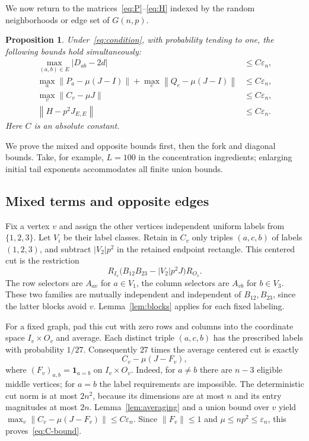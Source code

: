 \documentclass[11pt]{article}
\newtheorem{proposition}[theorem]{Proposition}
\theoremstyle{remark}
\newcommand{\one}{\mathbf 1}
\newcommand{\norm}[1]{\left\lVert#1\right\rVert}
\begin{document}
We now return to the matrices~\eqref{eq:P}--\eqref{eq:H} indexed by the
random neighborhoods or edge set of $G(n,p)$.

\begin{proposition}\label{prop:matrices}
Under~\eqref{eq:condition}, with probability tending to one, the following
bounds hold simultaneously:
\begin{align}
 \max_{(a,b)\in E}|D_{ab}-2d|&\leq C\varepsilon_n,\label{eq:D-bound}\\
 \max_a\norm{P_a-\mu(J-I)}+
 \max_e\norm{Q_e-\mu(J-I)}&\leq C\varepsilon_n,\label{eq:fork-bound}\\
 \max_v\norm{C_v-\mu J}&\leq C\varepsilon_n,\label{eq:C-bound}\\
 \norm{H-p^2J_{E,E}}&\leq C\varepsilon_n.\label{eq:H-bound}
\end{align}
Here $C$ is an absolute constant.
\end{proposition}

We prove the mixed and opposite bounds first, then the fork and diagonal
bounds. Take, for example, $L=100$ in the concentration ingredients;
enlarging initial tail exponents accommodates all finite union bounds.

\subsection{Mixed terms and opposite edges}

Fix a vertex $v$ and assign the other vertices independent uniform labels
from $\{1,2,3\}$. Let $V_i$ be their label classes. Retain in $C_v$
only triples $(a,c,b)$ of labels $(1,2,3)$, and subtract
$|V_2|p^2$ in the retained endpoint rectangle. This centered cut is the
restriction
\[
 R_{I_v}\bigl(B_{12}B_{23}-|V_2|p^2J\bigr)R_{O_v}.
\]
The row selectors are $A_{av}$ for $a\in V_1$, the column selectors
are $A_{vb}$ for $b\in V_3$. These two families are mutually independent
and independent of $B_{12},B_{23}$, since the latter blocks avoid $v$.
Lemma~\ref{lem:blocks} applies for each fixed labeling.

For a fixed graph, pad this cut with zero rows and columns into the
coordinate space $I_v\times O_v$ and average. Each distinct triple
$(a,c,b)$ has the prescribed labels with probability $1/27$.
Consequently $27$ times the average centered cut is exactly
\[
 C_v-\mu(J-F_v),
\]
where $(F_v)_{a,b}=\one_{a=b}$ on $I_v\times O_v$.
Indeed, for $a\ne b$ there are $n-3$ eligible middle vertices; for
$a=b$ the label requirements are impossible. The deterministic cut norm
is at most $2n^2$, because its dimensions are at most $n$ and its entry
magnitudes at most $2n$. Lemma~\ref{lem:averaging} and a union bound over
$v$ yield $\max_v\norm{C_v-\mu(J-F_v)}\leq C\varepsilon_n$.
Since $\norm{F_v}\leq1$ and $\mu\leq np^2\leq\varepsilon_n$,
this proves~\eqref{eq:C-bound}.
\end{document}
